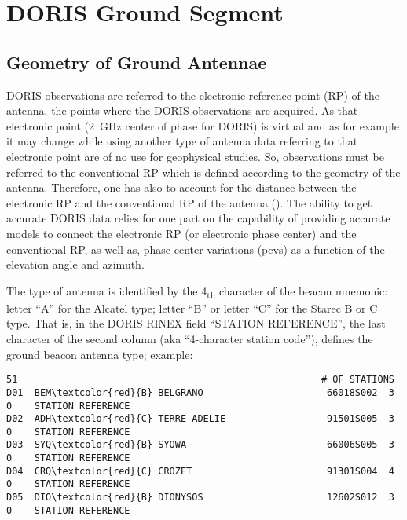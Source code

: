 \chapter{DORIS Ground Segment}
\label{ch:doris-ground-segment}


\section{Geometry of Ground Antennae}
DORIS observations are referred to the electronic reference point (RP) of the antenna, 
the points where the DORIS observations  are  acquired.  As  that  electronic  point 
(\SI{2}{\GHz} center of phase for DORIS) is virtual and as for example it may change 
while using another type of antenna data referring to that electronic point are of no 
use for geophysical studies. So, observations must be referred to the conventional RP 
which is defined according to the geometry of the antenna. Therefore, one has also to 
account for the distance between the electronic RP and the conventional RP of the antenna (\cite{TOURAIN2016}). 
The ability to get accurate DORIS data relies for one part on the capability of providing 
accurate models to connect the  electronic RP (or electronic phase center) and the conventional 
RP, as well as, phase center variations (\gls{pcv}s) as a function of the elevation angle and azimuth.

The type of antenna is identified by the 4\textsubscript{th} character of the beacon 
mnemonic: letter ``A'' for the Alcatel type; letter ``B'' or letter ``C'' for the 
Starec B or C type.  That is, in the DORIS RINEX field ``STATION REFERENCE'', the 
last character of the second column (aka ``4-character station code''), defines the 
ground beacon antenna type; example:

\begin{adjustbox}{max width=\linewidth , fbox=0.5pt}
\begin{BVerbatim}[commandchars=\\\{\}]
    51                                                      # OF STATIONS       
D01  BEM\textcolor{red}{B} BELGRANO                      66018S002  3   0    STATION REFERENCE   
D02  ADH\textcolor{red}{C} TERRE ADELIE                  91501S005  3   0    STATION REFERENCE   
D03  SYQ\textcolor{red}{B} SYOWA                         66006S005  3   0    STATION REFERENCE   
D04  CRQ\textcolor{red}{C} CROZET                        91301S004  4   0    STATION REFERENCE   
D05  DIO\textcolor{red}{B} DIONYSOS                      12602S012  3   0    STATION REFERENCE
\end{BVerbatim}
\end{adjustbox}

